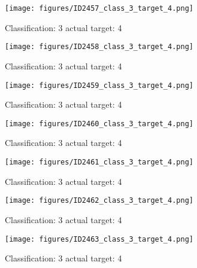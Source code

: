 \begin{figure}[h!]
\begin{center}
\texttt{[image: figures/ID2457\_class\_3\_target\_4.png]}
\end{center}
\caption{ Classification: 3 actual target: 4}
\label{fig:ID2457_class_3_target_4}
\end{figure}
\begin{figure}[h!]
\begin{center}
\texttt{[image: figures/ID2458\_class\_3\_target\_4.png]}
\end{center}
\caption{ Classification: 3 actual target: 4}
\label{fig:ID2458_class_3_target_4}
\end{figure}
\begin{figure}[h!]
\begin{center}
\texttt{[image: figures/ID2459\_class\_3\_target\_4.png]}
\end{center}
\caption{ Classification: 3 actual target: 4}
\label{fig:ID2459_class_3_target_4}
\end{figure}
\begin{figure}[h!]
\begin{center}
\texttt{[image: figures/ID2460\_class\_3\_target\_4.png]}
\end{center}
\caption{ Classification: 3 actual target: 4}
\label{fig:ID2460_class_3_target_4}
\end{figure}
\begin{figure}[h!]
\begin{center}
\texttt{[image: figures/ID2461\_class\_3\_target\_4.png]}
\end{center}
\caption{ Classification: 3 actual target: 4}
\label{fig:ID2461_class_3_target_4}
\end{figure}
\begin{figure}[h!]
\begin{center}
\texttt{[image: figures/ID2462\_class\_3\_target\_4.png]}
\end{center}
\caption{ Classification: 3 actual target: 4}
\label{fig:ID2462_class_3_target_4}
\end{figure}
\begin{figure}[h!]
\begin{center}
\texttt{[image: figures/ID2463\_class\_3\_target\_4.png]}
\end{center}
\caption{ Classification: 3 actual target: 4}
\label{fig:ID2463_class_3_target_4}
\end{figure}
